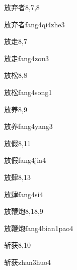 \begin{entry}{放弃者}{8,7,8}
  \begin{phonetics}{放弃者}{fang4qi4zhe3}
  \end{phonetics}
\end{entry}

\begin{entry}{放走}{8,7}
  \begin{phonetics}{放走}{fang4zou3}
  \end{phonetics}
\end{entry}

\begin{entry}{放松}{8,8}
  \begin{phonetics}{放松}{fang4song1}
  \end{phonetics}
\end{entry}

\begin{entry}{放养}{8,9}
  \begin{phonetics}{放养}{fang4yang3}
  \end{phonetics}
\end{entry}

\begin{entry}{放假}{8,11}
  \begin{phonetics}{放假}{fang4jia4}
  \end{phonetics}
\end{entry}

\begin{entry}{放肆}{8,13}
  \begin{phonetics}{放肆}{fang4si4}
  \end{phonetics}
\end{entry}

\begin{entry}{放鞭炮}{8,18,9}
  \begin{phonetics}{放鞭炮}{fang4bian1pao4}
  \end{phonetics}
\end{entry}

\begin{entry}{斩获}{8,10}
  \begin{phonetics}{斩获}{zhan3huo4}
  \end{phonetics}
\end{entry}

